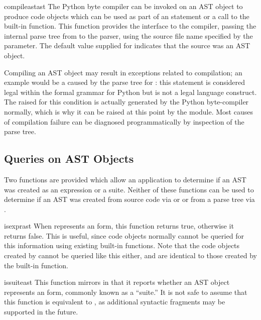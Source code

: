 \begin{funcdesc}{compileast}{ast}
The Python byte compiler can be invoked on an AST object to produce
code objects which can be used as part of an  statement or
a call to the built-in  function.
This function provides the interface to the compiler, passing the
internal parse tree from  to the parser, using the
source file name specified by the  parameter.
The default value supplied for  indicates that
the source was an AST object.

Compiling an AST object may result in exceptions related to
compilation; an example would be a  caused by the
parse tree for : this statement is considered legal
within the formal grammar for Python but is not a legal language
construct.  The  raised for this condition is
actually generated by the Python byte-compiler normally, which is why
it can be raised at this point by the  module.  Most
causes of compilation failure can be diagnosed programmatically by
inspection of the parse tree.
\end{funcdesc}


\subsection{Queries on AST Objects \label{Querying ASTs}}

Two functions are provided which allow an application to determine if
an AST was created as an expression or a suite.  Neither of these
functions can be used to determine if an AST was created from source
code via  or  or from a parse tree
via .

\begin{funcdesc}{isexpr}{ast}
When  represents an  form, this function
returns true, otherwise it returns false.  This is useful, since code
objects normally cannot be queried for this information using existing
built-in functions.  Note that the code objects created by
 cannot be queried like this either, and are
identical to those created by the built-in
 function.
\end{funcdesc}


\begin{funcdesc}{issuite}{ast}
This function mirrors  in that it reports whether an
AST object represents an  form, commonly known as a
``suite.''  It is not safe to assume that this function is equivalent
to , as additional syntactic fragments may
be supported in the future.
\end{funcdesc}


